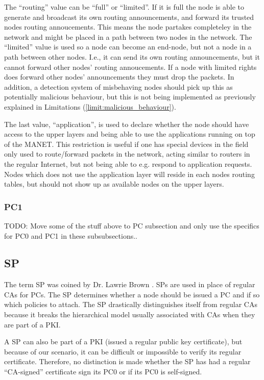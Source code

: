 The ``routing'' value can be ``full'' or ``limited''. If it is full the node is
able to generate and broadcast its own routing announcements, and forward its
trusted nodes routing annoucements. This means the node partakes completeley in
the network and might be placed in a path between two nodes in the network. The
``limited'' value is used so a node can become an end-node, but not a node in a
path between other nodes. I.e., it can send its own routing announcements, but
it cannot forward other nodes' routing annoucements. If a node with limited
rights does forward other nodes' announcements they must drop the packets. In
addition, a detection system of misbehaving nodes should pick up this as
potentially malicious behaviour, but this is not being implemented as previously
explained in Limitations (\ref{limit:malicious_behaviour}).

The last value, ``application'', is used to declare whether the node should have
access to the upper layers and being able to use the applications running on top
of the \ac{MANET}. This restriction is useful if one has special devices in the
field only used to route/forward packets in the network, acting similar to
routers in the regular Internet, but not being able to e.g. respond to
application requests. Nodes which does not use the application layer will reside
in each nodes routing tables, but should not show up as available nodes on the
upper layers.

\subsubsection*{\acf{PC1}}
TODO: Move some of the stuff above to PC subsection and only use the specifics
for PC0 and PC1 in these subsubsections..

\subsection{\acf{SP}}
The term \acl{SP} was coined by Dr. Lawrie Brown \cite{lawrie:technotes}.
\acp{SP} are used in place of regular \acp{CA} for \acp{PC}. The \ac{SP}
determines whether a node should be issued a \ac{PC} and if so which policies to
attach. The \ac{SP} drastically distinguishes itself from regular \acp{CA}
because it breaks the hierarchical model usually associated with \acp{CA} when
they are part of a \ac{PKI}.

A \ac{SP} can also be part of a \ac{PKI} (issued a regular public key
certificate), but because of our scenario, it can be difficult or impossible to
verify its regular certificate. Therefore, no distinction is made whether the
\ac{SP} has had a regular ``\ac{CA}-signed'' certificate sign its \ac{PC0} or if
its \ac{PC0} is self-signed.


